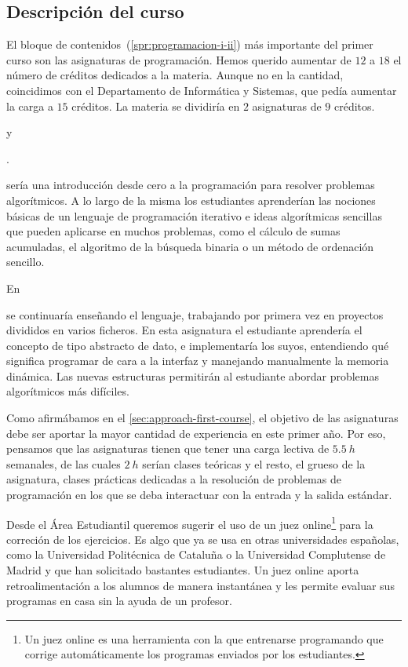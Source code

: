 \subsection{Descripción del curso}

El bloque de contenidos~(\cref{spr:programacion-i-ii})
más importante del primer curso son las asignaturas de programación.
Hemos querido aumentar de $12$ a $18$ el número de créditos
dedicados a la materia.
Aunque no en la cantidad,
coincidimos con el Departamento de Informática y Sistemas,
que pedía aumentar la carga a $15$ créditos.
La materia se dividiría en $2$ asignaturas de $9$ créditos.
\subject{Programación I} y \subject{Programación II}.

\subject{Programación I} sería una introducción desde cero a la programación
para resolver problemas algorítmicos.
A lo largo de la misma los estudiantes aprenderían las nociones básicas
de un lenguaje de programación iterativo e
ideas algorítmicas sencillas que pueden aplicarse en muchos problemas,
como el cálculo de sumas acumuladas,
el algoritmo de la búsqueda binaria
o un método de ordenación sencillo.

En \subject{Programación II} se continuaría enseñando el lenguaje,
trabajando por primera vez en proyectos divididos en varios ficheros.
En esta asignatura el estudiante aprendería
el concepto de tipo abstracto de dato,
e implementaría los suyos,
entendiendo qué significa programar de cara a la interfaz
y manejando manualmente la memoria dinámica.
Las nuevas estructuras permitirán al estudiante
abordar problemas algorítmicos más difíciles.

Como afirmábamos en el \cref{sec:approach-first-course},
el objetivo de las asignaturas debe ser
aportar la mayor cantidad de experiencia en este primer año.
Por eso, pensamos que las asignaturas
tienen que tener una carga lectiva de $\SI{5.5}{h}$ semanales,
de las cuales $\SI{2}{h}$ serían clases teóricas y el resto,
el grueso de la asignatura,
clases prácticas dedicadas a la resolución de problemas de programación
en los que se deba interactuar con la entrada y la salida estándar.

Desde el Área Estudiantil queremos sugerir el uso de un juez online\footnote{
    Un juez online es una herramienta con la que entrenarse programando
    que corrige automáticamente los programas enviados por los estudiantes.
} para la correción de los ejercicios.
Es algo que ya se usa en otras universidades españolas,
como la Universidad Politécnica de Cataluña o
la Universidad Complutense de Madrid y
que han solicitado bastantes estudiantes.
Un juez online aporta retroalimentación a los alumnos de manera instantánea
y les permite evaluar sus programas en casa sin la ayuda de un profesor.

